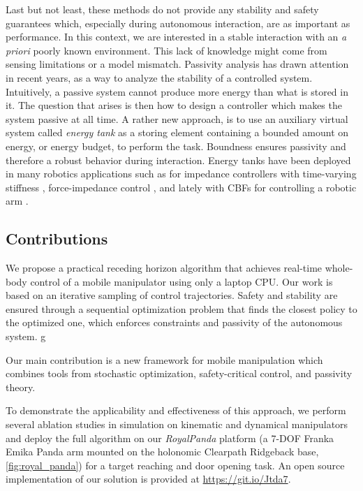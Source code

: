 Last but not least, these methods do not provide any stability and safety guarantees which, especially during autonomous interaction, are as important as performance. In this context, we are interested in a stable interaction with an \emph{a priori} poorly known environment. This lack of knowledge might come from sensing limitations or a model mismatch. Passivity analysis has drawn attention in recent years, as a way to analyze the stability of a controlled system. Intuitively, a passive system cannot produce more energy than what is stored in it. The question that arises is then how to design a controller which makes the system passive at all time. A rather new approach, is to use an auxiliary virtual system called \emph{energy tank} as a storing element containing a bounded amount on energy, or energy budget, to perform the task. Boundness ensures passivity \cite{secchi2019energy} and therefore a robust behavior during interaction. Energy tanks have been deployed in many robotics applications such as for impedance controllers with time-varying stiffness \cite{schindlbeck2015unified}, force-impedance control \cite{shahriari2018valve}, and lately with CBFs for controlling a robotic arm \cite{benzi2021optimization}.

\subsection{Contributions}

We propose a practical receding horizon algorithm that achieves real-time whole-body control of a mobile manipulator using only a laptop CPU. Our work is based on an iterative sampling of control trajectories. Safety and stability are ensured through a sequential optimization problem that finds the closest policy to the optimized one, which enforces constraints and passivity of the autonomous system. g

Our main contribution is a new framework for mobile manipulation which combines tools from stochastic optimization, safety-critical control, and passivity theory.

To demonstrate the applicability and effectiveness of this approach, we perform several ablation studies in simulation on kinematic and dynamical manipulators and deploy the full algorithm on our \textit{RoyalPanda} platform (a 7-DOF Franka Emika Panda arm mounted on the holonomic Clearpath Ridgeback base, \fig\ref{fig:royal_panda}) for a target reaching and door opening task. An open source implementation of our solution is provided at \url{https://git.io/Jtda7}.

